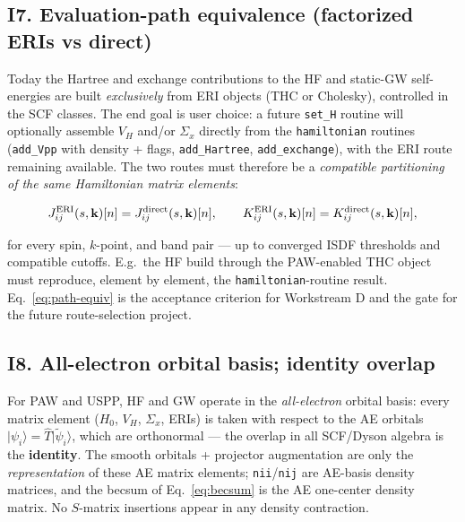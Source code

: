\documentclass[11pt]{article}
\newcommand{\ket}[1]{\lvert #1 \rangle}
\newcommand{\code}[1]{\texttt{\small #1}}
\begin{document}
\subsection*{I7. Evaluation-path equivalence (factorized ERIs vs direct)}

Today the Hartree and exchange contributions to the HF and static-GW
self-energies are built \emph{exclusively} from ERI objects (THC or
Cholesky), controlled in the SCF classes. The end goal is user choice: a
future \code{set\_H} routine will optionally assemble $V_H$ and/or
$\Sigma_x$ directly from the \code{hamiltonian} routines
(\code{add\_Vpp} with density + flags, \code{add\_Hartree},
\code{add\_exchange}), with the ERI route remaining available. The two
routes must therefore be a \emph{compatible partitioning of the same
Hamiltonian matrix elements}:
\begin{keybox}
\begin{equation}
J^{\rm ERI}_{ij}(s,\mathbf{k})[n] = J^{\rm direct}_{ij}(s,\mathbf{k})[n],
\qquad
K^{\rm ERI}_{ij}(s,\mathbf{k})[n] = K^{\rm direct}_{ij}(s,\mathbf{k})[n],
\label{eq:path-equiv}
\end{equation}
\end{keybox}
for every spin, $k$-point, and band pair --- up to converged ISDF
thresholds and compatible cutoffs. E.g.\ the HF build through the
PAW-enabled THC object must reproduce, element by element, the
\code{hamiltonian}-routine result. Eq.~\eqref{eq:path-equiv} is the
acceptance criterion for Workstream D and the gate for the future
route-selection project.

\subsection*{I8. All-electron orbital basis; identity overlap}

For PAW and USPP, HF and GW operate in the \emph{all-electron} orbital
basis: every matrix element ($H_0$, $V_H$, $\Sigma_x$, ERIs) is taken with
respect to the AE orbitals $\ket{\psi_i} = \hat{T}\ket{\tilde\psi_i}$,
which are orthonormal --- the overlap in all SCF/Dyson algebra is the
\textbf{identity}. The smooth orbitals + projector augmentation are only
the \emph{representation} of these AE matrix elements; \code{nii}/\code{nij}
are AE-basis density matrices, and the becsum of Eq.~\eqref{eq:becsum} is
the AE one-center density matrix. No $S$-matrix insertions appear in any
density contraction.

\end{document}
